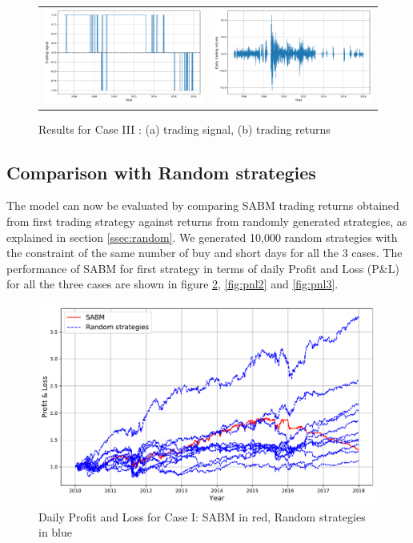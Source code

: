 \begin{figure}[h!] 
\begin{tabular}{cc}
\centering 
 \includegraphics[width=0.5\linewidth]{figures/tradingSig_llf5.pdf} & \includegraphics[width=0.5\linewidth]{figures/tradingRet_llf5.pdf} \\
\end{tabular}
\caption{Results for Case III : (a) trading signal, (b) trading returns}
\label{fig:t3}
\end{figure}

\subsection{Comparison with Random strategies}

The model can now be evaluated by comparing SABM trading returns obtained from first trading strategy against returns from randomly generated strategies, as explained in section \ref{ssec:random}. We generated 10,000 random strategies with the constraint of the same number of buy and short days for all the 3 cases. 
The performance of SABM for first strategy in terms of daily Profit and Loss (P\&L) for all the three cases are shown in figure \ref{fig:pnl1}, \ref{fig:pnl2} and \ref{fig:pnl3}. 

\begin{figure}[h!]
\centering 
 \includegraphics[width=0.75\linewidth]{figures/pnls_yearly.pdf} 
\caption{Daily Profit and Loss for Case I: SABM in red, Random strategies in blue}
\label{fig:pnl1}
\end{figure}

